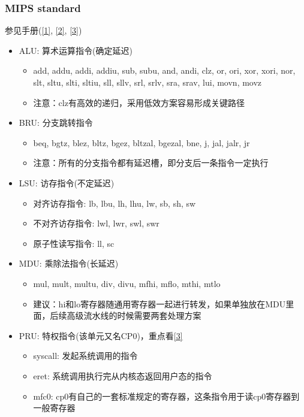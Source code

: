 \documentclass[lang=cn,11pt,a4paper]{elegantpaper}
\begin{document}
\subsubsection{MIPS standard}
参见手册(\href{run:../manuals/MIPS_Vol1.pdf}{[1]}, \href{run:../manuals/MIPS_Vol2.pdf}{[2]}, \href{run:../manuals/MIPS_Vol3.pdf}{[3]})
\begin{itemize}
\item ALU: 算术运算指令(确定延迟)
  \begin{itemize}
  \item add, addu, addi, addiu, sub, subu, and, andi, clz, or, ori, xor, xori, nor, slt, sltu, slti, sltiu, sll, sllv, srl, srlv, sra, srav, lui, movn, movz
  \item 注意：clz有高效的递归，采用低效方案容易形成关键路径
  \end{itemize}
\item BRU: 分支跳转指令
  \begin{itemize}
  \item beq, bgtz, blez, bltz, bgez, bltzal, bgezal, bne, j, jal, jalr, jr
  \item 注意：所有的分支指令都有延迟槽，即分支后一条指令一定执行
  \end{itemize}
\item LSU: 访存指令(不定延迟)
  \begin{itemize}
  \item 对齐访存指令: lb, lbu, lh, lhu, lw, sb, sh, sw
  \item 不对齐访存指令: lwl, lwr, swl, swr
  \item 原子性读写指令: ll, sc
  \end{itemize}
\item MDU: 乘除法指令(长延迟)
  \begin{itemize}
  \item mul, mult, multu, div, divu, mfhi, mflo, mthi, mtlo
  \item 建议：hi和lo寄存器随通用寄存器一起进行转发，如果单独放在MDU里面，后续高级流水线的时候需要两套处理方案
  \end{itemize}
\item PRU: 特权指令(该单元又名CP0)，重点看\href{../manuals/MIPS_Vol3.pdf}{[3]}
  \begin{itemize}
  \item syscall: 发起系统调用的指令
  \item eret: 系统调用执行完从内核态返回用户态的指令
  \item mfc0: cp0有自己的一套标准规定的寄存器，这条指令用于读cp0寄存器到一般寄存器

\end{itemize}
\end{itemize}
\end{document}
